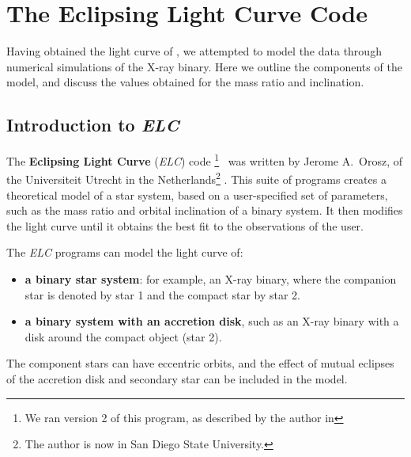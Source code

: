 
\chapter{The Eclipsing Light Curve Code}\label{cha:ELC}

Having obtained the light curve of \groj, we attempted to model the data through numerical simulations of the X-ray binary. Here we outline the components of the model, and discuss the values obtained for the mass ratio and inclination.


\section{Introduction to \textit{ELC}}\label{cha:ELC:sec:IntroductionELC}

The \textbf{Eclipsing Light Curve} (\textit{ELC}) code%
\footnote{\label{cha:ELC:sec:IntroductionELC:foot:ELC}
We ran version 2 of this program, as described by the author in %
%
}%
\ was written by Jerome A.\ Orosz, of the Universiteit Utrecht in
the Netherlands\footnote{\label{cha:ELC:sec:IntroductionELC:foot:Orosz}%
The author is now in San Diego State University. %
}%
. This suite of programs creates a theoretical model of a star
system, based on a user-specified set of parameters, such as the mass
ratio and orbital inclination of a binary system. It then modifies the
light curve until it obtains the best fit to the observations of the
user. %

\vspace{\myparskip}

The \textit{ELC} programs can model the light curve of:
\begin{itemize}


\item
\textbf{a binary star system}: for example, an X-ray binary, where the
companion star is denoted by star 1 and the compact star by star 2. %

\item
\textbf{a binary system with an accretion disk}, such as an X-ray binary with
a disk around the compact object (star 2). %

\end{itemize}
The component stars can have eccentric orbits, and the effect of
mutual eclipses of the accretion disk and secondary star can be
included in the model. %

